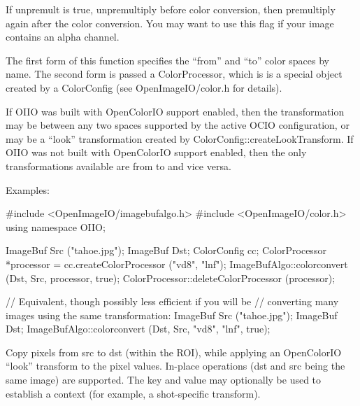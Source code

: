 If {\cf unpremult} is {\cf true}, unpremultiply before color conversion,
then premultiply again after the color conversion.  You may want to use
this flag if your image contains an alpha channel.

The first form of this function specifies the ``from''
and ``to'' color spaces by name.
The second form is passed a {\cf ColorProcessor},
which is is a special object created by a
{\cf ColorConfig} (see {\cf OpenImageIO/color.h} for details).

If OIIO was built with OpenColorIO support enabled, then the transformation
may be between any two spaces supported by the active OCIO configuration, or
may be a ``look'' transformation created by {\cf
ColorConfig::createLookTransform}.  If OIIO was not built with OpenColorIO
support enabled, then the only transformations available are from 
to  and vice versa.

\smallskip
\noindent Examples:
\begin{code}
    #include <OpenImageIO/imagebufalgo.h>
    #include <OpenImageIO/color.h>
    using namespace OIIO;

    ImageBuf Src ("tahoe.jpg");
    ImageBuf Dst;
    ColorConfig cc;
    ColorProcessor *processor = cc.createColorProcessor ("vd8", "lnf");
    ImageBufAlgo::colorconvert (Dst, Src, processor, true);
    ColorProcessor::deleteColorProcessor (processor);

    // Equivalent, though possibly less efficient if you will be
    // converting many images using the same transformation:
    ImageBuf Src ("tahoe.jpg");
    ImageBuf Dst;
    ImageBufAlgo::colorconvert (Dst, Src, "vd8", "lnf", true);
\end{code}
\apiend

 
Copy pixels from {\cf src} to {\cf dst} (within the ROI), while
applying an OpenColorIO ``look'' transform to the pixel values.
In-place operations ({\cf dst} and {\cf src} being the same image)
are supported.  The {\cf key} and {\cf value} may optionally be used
to establish a context (for example, a shot-specific transform).


